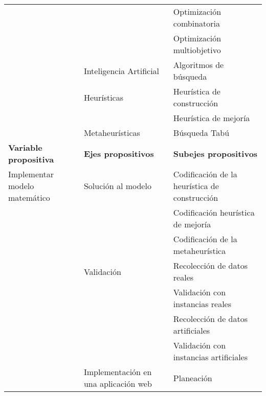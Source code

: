 \begin{landscape}
\begin{table}[ht]
\begin{tabular}{L{9cm}ll}
                                     &                                         & Optimización combinatoria                      \\
                                     &                                         & Optimización multiobjetivo                     \\ 
                                     & Inteligencia Artificial                 & Algoritmos de búsqueda                         \\ 
                                     & Heurísticas                             & Heurística de construcción                     \\
                                     &                                         & Heurística de mejoría                          \\ 
                                     & Metaheurísticas                         & Búsqueda Tabú                                  \\ \hline
\textbf{Variable propositiva}        & \textbf{Ejes propositivos}              & \textbf{Subejes propositivos}                  \\ \hline
Implementar modelo matemático        & Solución al modelo                      & Codificación de la heurística de construcción  \\
                                     &                                         & Codificación heurística de mejoría             \\
                                     &                                         & Codificación de la metaheurística              \\ 
                                     & Validación                              & Recolección de datos reales                    \\
                                     &                                         & Validación con instancias reales               \\
                                     &                                         & Recolección de datos artificiales              \\
                                     &                                         & Validación con instancias artificiales         \\ 
                                     & Implementación en una aplicación web    & Planeación                                     \\

\end{tabular}
\end{table}
\end{landscape}

